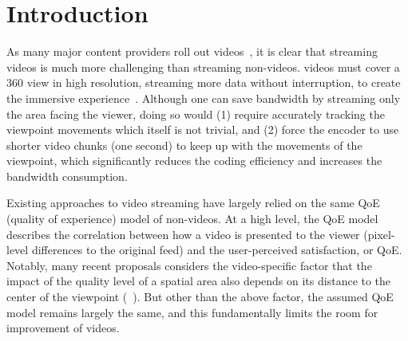
\section{Introduction}



As many major content providers roll out \vr videos~\cite{??,??,??,??,??}, 
it is clear that streaming \vr videos is much more challenging than streaming non-\vr videos.
\vr videos must cover a 360\textdegree{} view in high resolution, \ie streaming more data without interruption, to create the immersive experience~\cite{??}. 
Although one can save bandwidth by streaming only the area facing the viewer, doing so would (1) require accurately tracking the viewpoint movements which itself is not trivial, and (2) force the encoder to use shorter video chunks (\eg one second) to keep up with the movements of the viewpoint, which significantly reduces the coding efficiency and increases the bandwidth consumption.

Existing approaches to \vr video streaming have largely relied on the same QoE (quality of experience) model of non-\vr videos. 
At a high level, the QoE model describes the correlation between how a video is presented to the viewer (\eg pixel-level differences to the original feed) and the user-perceived satisfaction, or QoE.
Notably, many recent proposals considers the {\vr}video-specific factor that the impact of the quality level of a spatial area also depends on its distance to the center of the viewpoint (\eg~\cite{??,??,??,??}).
But other than the above factor, the assumed QoE model remains largely the same, and this fundamentally limits the room for improvement of \vr videos.



